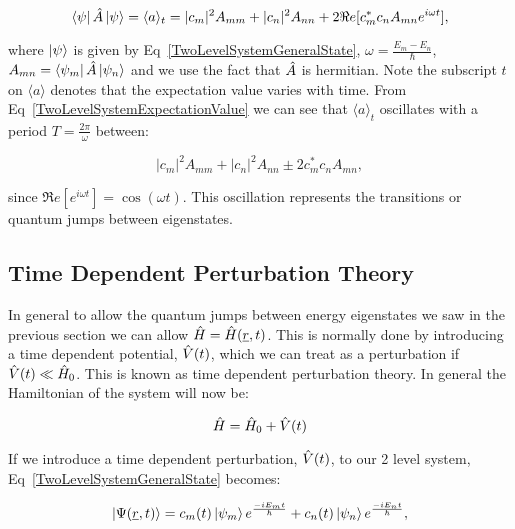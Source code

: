 \begin{equation}
    \bra{\psi}\Hat{A}\ket{\psi} = \langle a \rangle _t = |c_m|^2 A_{mm} + |c_n|^2 A_{nn} + 2 \Re e[c_m^* c_n A_{mn} e^{i\omega t}],
    \label{TwoLevelSystemExpectationValue}
\end{equation}

\noindent where $\ket{\psi}$ is given by Eq~\ref{TwoLevelSystemGeneralState}, $\omega = \frac{E_m - E_n}{\hbar}$, $A_{mn} = \bra{\psi_m}\Hat{A}\ket{\psi_n}$ and we use the fact that $\Hat{A}$ is hermitian. Note the subscript $t$ on $\langle a \rangle$ denotes that the expectation value varies with time. From Eq~\ref{TwoLevelSystemExpectationValue} we can see that $\langle a \rangle _t$ oscillates with a period $T = \frac{2\pi}{\omega}$ between:

\begin{equation}
    |c_m|^2 A_{mm} + |c_n|^2 A_{nn} \pm 2 c_m^* c_n A_{mn},
\end{equation}

\noindent since $\Re e[e^{i \omega t}] = \cos(\omega t)$. This oscillation represents the transitions or quantum jumps between eigenstates.

\subsection{Time Dependent Perturbation Theory}

In general to allow the quantum jumps between energy eigenstates we saw in the previous section we can allow $\Hat{H} = \Hat{H}(\underline{r}, t)$. This is normally done by introducing a time dependent potential, $\Hat{V}(t)$, which we can treat as a perturbation if $\Hat{V}(t) \ll \Hat{H}_0$. This is known as time dependent perturbation theory. In general the Hamiltonian of the system will now be:

\begin{equation}
    \Hat{H} = \Hat{H}_0 + \Hat{V}(t)
    \label{TimeDependentHamiltonian}
\end{equation}

\noindent If we introduce a time dependent perturbation, $\Hat{V}(t)$, to our 2 level system, Eq~\ref{TwoLevelSystemGeneralState} becomes:

\begin{equation}
    \ket{\Psi(\underline{r}, t)} = c_m(t) \ket{\psi_m} e^\frac{-i E_m t}{\hbar} + c_n(t) \ket{\psi_n} e^\frac{-i E_n t}{\hbar},
    \label{TwoLevelPerturbedSystemGeneralState}
\end{equation}

